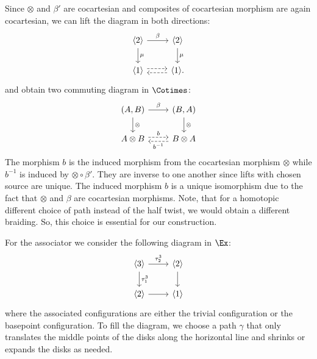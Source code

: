 Since $\otimes$ and $\beta'$ are cocartesian and composites of cocartesian morphism are again 
cocartesian, we can lift the diagram in both directions:
\[    
    \begin{tikzcd}
        \langle 2 \rangle \arrow[r, "\beta"] \arrow[d, "\mu"] & \langle 2 \rangle \arrow[d, "\mu"] \\
        \langle 1 \rangle  \arrow[r, dashed, shift left]                  & \langle 1 \rangle. \arrow[l, dashed, shift left]                
    \end{tikzcd}
\]
and obtain two commuting diagram in $\Cotimes$:
\[
\begin{tikzcd}
{(A,B)} \arrow[r, "\beta"] \arrow[d, "\otimes"] & {(B,A)} \arrow[d, "\otimes"]                        \\
A \otimes B \arrow[r, "b", dashed, shift left]  & B \otimes A \arrow[l, "b^{-1}", dashed, shift left]
\end{tikzcd}
\]
The morphism $b$ is the induced morphism from the cocartesian morphism $\otimes$ while $b^{-1}$ 
is induced by $\otimes \circ \beta'$. 
They are inverse to one another since lifts with chosen source are unique.
The induced morphism $b$ is a unique isomorphism due to the fact that $\otimes$ and $\beta$ are cocartesian morphisms.
Note, that for a homotopic different choice of path instead of the half twist, we would obtain a
different braiding. So, this choice is essential for our construction.

For the associator we consider the following diagram in $\Ex$:
    \[
    \begin{tikzcd}
        \langle 3 \rangle \arrow[r, "\tau_2^3"] \arrow[d, "\tau^3_1"] & \langle 2 \rangle \arrow[d] \\
        \langle 2 \rangle \arrow[r]                                   & \langle 1 \rangle          
    \end{tikzcd}
    \]
    where the associated configurations are either the trivial configuration or the basepoint configuration.
    To fill the diagram, we choose a path $\gamma$ that only translates the middle points of the disks along the 
    horizontal line and shrinks or expands the disks as needed.


 



